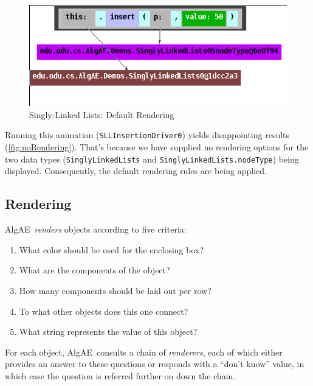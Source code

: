 \documentclass[11pt,titlepage]{book}
\newcommand{\algae}{{\sc AlgAE}}
\begin{document}
\begin{figure}
  \begin{center}
    \includegraphics[scale=0.5]{images/noRendering}
  \end{center}
  \caption{Singly-Linked Lists: Default Rendering}\label{fig:noRendering}
  
\end{figure}

Running this animation (\texttt{SLLInsertionDriver0}) yields disappointing results (\autoref{fig:noRendering}). That's because we have supplied no rendering options for the two data types (\texttt{SinglyLinkedLists} and \texttt{SinglyLinkedLists.nodeType}) being displayed. Consequently, the default rendering rules are being applied.

\subsection{Rendering}

\algae\ {\em renders} objects according to five criteria:
\begin{enumerate}
\item What color should be used for the enclosing box?
\item What are the components of the object?
\item How many components should be laid out per row?
\item To what other objects does this one connect?
\item What string represents the value of this object?
\end{enumerate}

For each object, \algae\ consults a chain of {\em renderers}, each of
which either provides an answer to these questions or responds with a
``don't know'' value, in which case the question is referred further
on down the chain.
\end{document}
